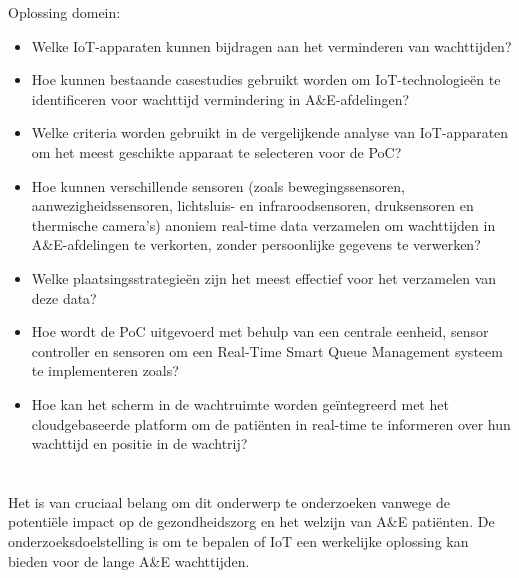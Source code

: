 Oplossing domein:
\begin{itemize}
    \item Welke IoT-apparaten kunnen bijdragen aan het verminderen van wachttijden?
    \item Hoe kunnen bestaande casestudies gebruikt worden om IoT-technologieën te identificeren voor wachttijd vermindering in A\&E-afdelingen?
    \item Welke criteria worden gebruikt in de vergelijkende analyse van IoT-apparaten om het meest geschikte apparaat te selecteren voor de PoC?
    \item Hoe kunnen verschillende sensoren (zoals bewegingssensoren, aanwezigheidssensoren, lichtsluis- en infraroodsensoren, druksensoren en thermische camera’s) anoniem real-time data verzamelen om wachttijden in A\&E-afdelingen te verkorten, zonder persoonlijke gegevens te verwerken?
    \item Welke plaatsingsstrategieën zijn het meest effectief voor het verzamelen van deze data?
    \item Hoe wordt de PoC uitgevoerd met behulp van een centrale eenheid, sensor controller en sensoren om een Real-Time Smart Queue Management systeem \autocite{Ghazal2015} te implementeren zoals? 
    \item Hoe kan het scherm in de wachtruimte worden geïntegreerd met het cloudgebaseerde platform om de patiënten in real-time te informeren over hun wachttijd en positie in de wachtrij? \TODO
\end{itemize}


\section{}%
\label{sec:onderzoeksdoelstelling}
Het is van cruciaal belang om dit onderwerp te onderzoeken vanwege de potentiële impact op de gezondheidszorg en het welzijn van A\&E patiënten. De onderzoeksdoelstelling is om te bepalen of IoT een werkelijke oplossing kan bieden voor de lange A\&E wachttijden.


